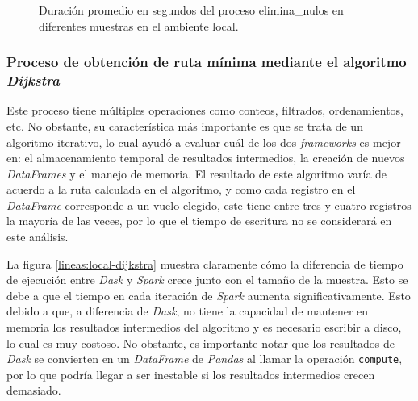 \begin{figure}
\centering
{}
\caption{Duración promedio en segundos del proceso elimina\_nulos en diferentes muestras en el ambiente local.}
\label{lineas:local-elimina-nulos}
\end{figure}

\subsubsection{Proceso de obtención de ruta mínima mediante el algoritmo \textit{Dijkstra}}

Este proceso tiene múltiples operaciones como conteos, filtrados, ordenamientos, etc. No obstante, su característica más importante es que se trata de un algoritmo iterativo, lo cual ayudó a evaluar cuál de los dos \textit{frameworks} es mejor en: el almacenamiento temporal de resultados intermedios, la creación de nuevos \textit{DataFrames} y el manejo de memoria. El resultado de este algoritmo varía de acuerdo a la ruta calculada en el algoritmo, y como cada registro en el \textit{DataFrame} corresponde a un vuelo elegido, este tiene entre tres y cuatro registros la mayoría de las veces, por lo que el tiempo de escritura no se considerará en este análisis.

La figura \ref{lineas:local-dijkstra} muestra claramente cómo la diferencia de tiempo de ejecución entre \textit{Dask} y \textit{Spark} crece junto con el tamaño de la muestra. Esto se debe a que el tiempo en cada iteración de \textit{Spark} aumenta significativamente. Esto debido a que, a diferencia de \textit{Dask}, no tiene la capacidad de mantener en memoria los resultados intermedios del algoritmo y es necesario escribir a disco, lo cual es muy costoso. No obstante, es importante notar que los resultados de \textit{Dask} se convierten en un \textit{DataFrame} de \textit{Pandas} al llamar la operación \texttt{compute}, por lo que podría llegar a ser inestable si los resultados intermedios crecen demasiado.

